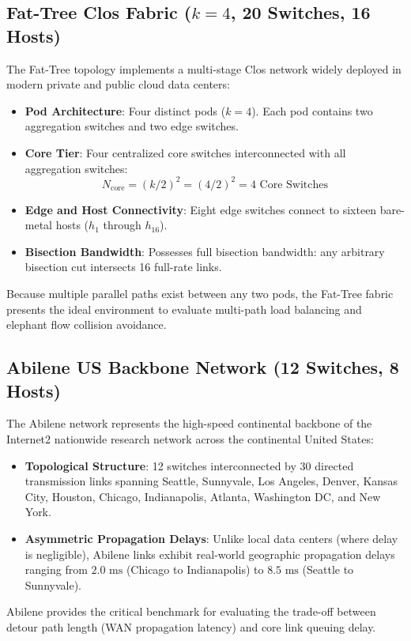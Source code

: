 \subsection{Fat-Tree Clos Fabric ($k=4$, 20 Switches, 16 Hosts)}
The Fat-Tree topology \cite{al2008scalable} implements a multi-stage Clos network widely deployed in modern private and public cloud data centers:
\begin{itemize}
    \item \textbf{Pod Architecture}: Four distinct pods ($k=4$). Each pod contains two aggregation switches and two edge switches.
    \item \textbf{Core Tier}: Four centralized core switches interconnected with all aggregation switches:
    \begin{equation}
        N_{\text{core}} = (k/2)^2 = (4/2)^2 = 4 \text{ Core Switches}
    \end{equation}
    \item \textbf{Edge and Host Connectivity}: Eight edge switches connect to sixteen bare-metal hosts ($h_1$ through $h_{16}$).
    \item \textbf{Bisection Bandwidth}: Possesses full bisection bandwidth: any arbitrary bisection cut intersects 16 full-rate links.
\end{itemize}
Because multiple parallel paths exist between any two pods, the Fat-Tree fabric presents the ideal environment to evaluate multi-path load balancing and elephant flow collision avoidance.

\subsection{Abilene US Backbone Network (12 Switches, 8 Hosts)}
The Abilene network represents the high-speed continental backbone of the Internet2 nationwide research network across the continental United States:
\begin{itemize}
    \item \textbf{Topological Structure}: 12 switches interconnected by 30 directed transmission links spanning Seattle, Sunnyvale, Los Angeles, Denver, Kansas City, Houston, Chicago, Indianapolis, Atlanta, Washington DC, and New York.
    \item \textbf{Asymmetric Propagation Delays}: Unlike local data centers (where delay is negligible), Abilene links exhibit real-world geographic propagation delays ranging from $2.0\text{ ms}$ (Chicago to Indianapolis) to $8.5\text{ ms}$ (Seattle to Sunnyvale).
\end{itemize}
Abilene provides the critical benchmark for evaluating the trade-off between detour path length (WAN propagation latency) and core link queuing delay.

